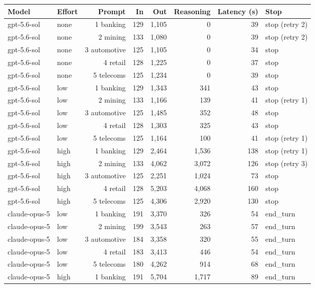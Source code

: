 \documentclass[11pt]{article}
\begin{document}
\begin{table}[p]
\centering
\small
\begin{tabular}{llrrrrrl}
\toprule
Model & Effort & Prompt & In & Out & Reasoning & Latency (s) & Stop \\
\midrule
gpt-5.6-sol & none & 1 banking & 129 & 1{,}105 & 0 & 39 & stop (retry 2) \\
gpt-5.6-sol & none & 2 mining & 133 & 1{,}080 & 0 & 39 & stop (retry 2) \\
gpt-5.6-sol & none & 3 automotive & 125 & 1{,}105 & 0 & 34 & stop \\
gpt-5.6-sol & none & 4 retail & 128 & 1{,}225 & 0 & 37 & stop \\
gpt-5.6-sol & none & 5 telecoms & 125 & 1{,}234 & 0 & 39 & stop \\
gpt-5.6-sol & low & 1 banking & 129 & 1{,}343 & 341 & 43 & stop \\
gpt-5.6-sol & low & 2 mining & 133 & 1{,}166 & 139 & 41 & stop (retry 1) \\
gpt-5.6-sol & low & 3 automotive & 125 & 1{,}485 & 352 & 48 & stop \\
gpt-5.6-sol & low & 4 retail & 128 & 1{,}303 & 325 & 43 & stop \\
gpt-5.6-sol & low & 5 telecoms & 125 & 1{,}164 & 100 & 41 & stop (retry 1) \\
gpt-5.6-sol & high & 1 banking & 129 & 2{,}464 & 1{,}536 & 138 & stop (retry 1) \\
gpt-5.6-sol & high & 2 mining & 133 & 4{,}062 & 3{,}072 & 126 & stop (retry 3) \\
gpt-5.6-sol & high & 3 automotive & 125 & 2{,}251 & 1{,}024 & 73 & stop \\
gpt-5.6-sol & high & 4 retail & 128 & 5{,}203 & 4{,}068 & 160 & stop \\
gpt-5.6-sol & high & 5 telecoms & 125 & 4{,}306 & 2{,}920 & 130 & stop \\
claude-opus-5 & low & 1 banking & 191 & 3{,}370 & 326 & 54 & end\_turn \\
claude-opus-5 & low & 2 mining & 199 & 3{,}543 & 263 & 57 & end\_turn \\
claude-opus-5 & low & 3 automotive & 184 & 3{,}358 & 320 & 55 & end\_turn \\
claude-opus-5 & low & 4 retail & 183 & 3{,}413 & 446 & 54 & end\_turn \\
claude-opus-5 & low & 5 telecoms & 180 & 4{,}262 & 914 & 68 & end\_turn \\
claude-opus-5 & high & 1 banking & 191 & 5{,}704 & 1{,}717 & 89 & end\_turn \\

\end{tabular}
\end{table}
\end{document}
